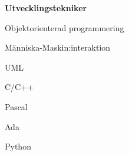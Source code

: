 \documentclass[a4paper,swedish,11pt]{article}
\newenvironment*{descriptioncv}[1]%
{%
  \textbf{\normalsize #1}%
  \begin{description}[nosep,font=\sffamily\bfseries, leftmargin=0.5cm,style=nextline]%
  }%
  {\end{description}\vspace{0.4cm}}
\newcommand*{\cvitem}[3]{\item[#1]{\cinzel\normalsize#2}\\#3}
\begin{document}
\begin{minipage}[t]{0.73\textwidth}





  \textbf{Utvecklingstekniker}
  \begin{description}[nosep]
    \small
  \item Objektorienterad programmering
  \item Människa-Maskin:interaktion
  \item UML
  \item C/C++
  \item Pascal
  \item Ada
  \item Python
  \end{description}


\end{minipage}
\end{document}
